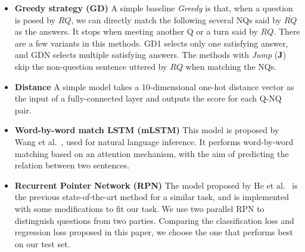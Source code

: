 \begin{itemize}
\item\textbf{Greedy strategy (GD)}
A simple baseline \textit{Greedy} is that, when a question is posed by $RQ$, we can directly match the following several NQs said by $\overline{RQ}$ as the answers. It stops when meeting another Q or a turn said by $RQ$. 
There are a few variants in this methods. GD1 selects only one satisfying answer, 
and GDN selects multiple satisfying answers. The methods with \textit{Jump} 
(\textbf{J}) skip the non-question sentence uttered by $RQ$ when matching the 
NQs. 



\item\textbf{Distance}
A simple model takes a 10-dimensional one-hot distance vector as the input of a fully-connected layer and outputs the score for each Q-NQ pair.  


\item\textbf{Word-by-word match LSTM (mLSTM)}
This model is proposed by Wang et al.~\cite{wang2016learning}, used for natural language inference. It performs word-by-word matching based on an attention mechanism, with the aim of predicting the relation between two sentences.


\item \textbf{Recurrent Pointer Network (RPN)}
The model proposed by He et al.~\cite{he2019learning} is the previous
state-of-the-art method for a similar task, and is implemented with some modifications to fit our task. We use two parallel RPN to distinguish questions from two parties. Comparing the classification loss and regression loss proposed in this paper, we choose the one that performs best on our test set.

\end{itemize}

